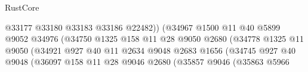 \begin{lexlean}{RustCore}
\begin{coremodule}
                                                  @33177
                                                  @33180
                                                  @33183
                                                  @33186
                                                  @22482))
                                              (@34967
                                                @1500
                                                @11
                                                @40
                                                @5899
                                                @9052
                                                @34976
                                                (@34750
                                                  @1325
                                                  @158
                                                  @11
                                                  @28
                                                  @9050
                                                  @2680
                                                  (@34778
                                                    @1325
                                                    @11
                                                    @9050
                                                    (@34921
                                                      @927
                                                      @40
                                                      @11
                                                      @2634
                                                      @9048
                                                      @2683
                                                      @1656
                                                      (@34745
                                                        @927
                                                        @40
                                                        @9048
                                                        (@36097
                                                          @158
                                                          @11
                                                          @28
                                                          @9046
                                                          @2680
                                                          (@35857
                                                            @9046
                                                            (@35863
                                                              @5966

\end{coremodule}
\end{lexlean}
